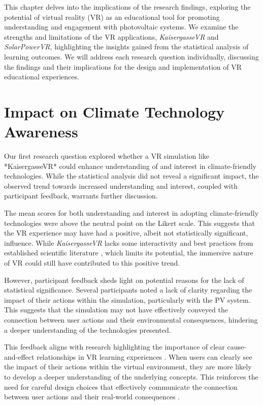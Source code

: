 \documentclass[draft, final]{vutinfth} %
\begin{document}
This chapter delves into the implications of the research findings, exploring the potential of virtual reality (VR) as an educational tool for promoting understanding and engagement with photovoltaic systems. We examine the strengths and limitations of the VR applications, \textit{KaisergasseVR} and \textit{SolarPowerVR}, highlighting the insights gained from the statistical analysis of learning outcomes. We will address each research question individually, discussing the findings and their implications for the design and implementation of VR educational experiences.

\section{Impact on Climate Technology Awareness}

Our first research question explored whether a VR simulation like *KaisergasseVR* could enhance understanding of and interest in climate-friendly technologies. While the statistical analysis did not reveal a significant impact, the observed trend towards increased understanding and interest, coupled with participant feedback, warrants further discussion.

The mean scores for both understanding and interest in adopting climate-friendly technologies were above the neutral point on the Likert scale. This suggests that the VR experience may have had a positive, albeit not statistically significant, influence. While \textit{KaisergasseVR} lacks some interactivity and best practices from established scientific literature \cite{Dalgarno2010Learning, Gee2009Deep}, which limits its potential, the immersive nature of VR could still have contributed to this positive trend.

However, participant feedback sheds light on potential reasons for the lack of statistical significance. Several participants noted a lack of clarity regarding the impact of their actions within the simulation, particularly with the PV system. This suggests that the simulation may not have effectively conveyed the connection between user actions and their environmental consequences, hindering a deeper understanding of the technologies presented.

This feedback aligns with research highlighting the importance of clear cause-and-effect relationships in VR learning experiences \cite{Bailenson2008Transformations, Merchant2014VrEffectiveness}.  When users can clearly see the impact of their actions within the virtual environment, they are more likely to develop a deeper understanding of the underlying concepts. This reinforces the need for careful design choices that effectively communicate the connection between user actions and their real-world consequences \cite{Ding2022VrApplication}.
\end{document}
